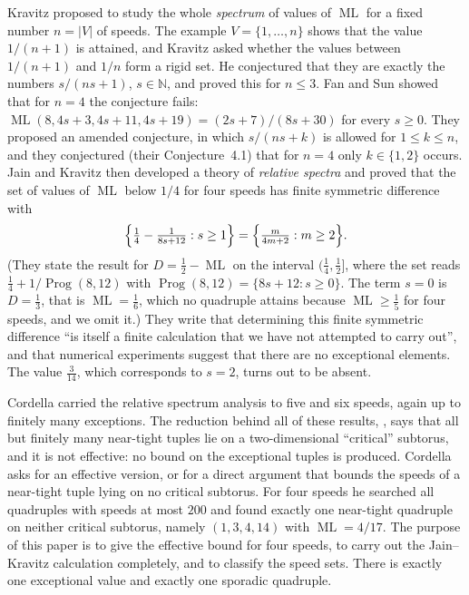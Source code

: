 \documentclass[12pt]{amsart}
\theoremstyle{definition}\newtheorem{definition}[theorem]{Definition}
\theoremstyle{remark}\newtheorem{remark}[theorem]{Remark}
\newcommand{\ML}{\operatorname{ML}}
\begin{document}
Kravitz \cite{Kravitz} proposed to study the whole \emph{spectrum} of values of $\ML$ for a fixed number $n=|V|$ of speeds. The example $V=\{1,\dots,n\}$ shows that the value $1/(n+1)$ is attained, and Kravitz asked whether the values between $1/(n+1)$ and $1/n$ form a rigid set. He conjectured that they are exactly the numbers $s/(ns+1)$, $s\in\mathbb N$, and proved this for $n\le 3$. Fan and Sun \cite{FanSun} showed that for $n=4$ the conjecture fails: $\ML(8,4s+3,4s+11,4s+19)=(2s+7)/(8s+30)$ for every $s\ge 0$. They proposed an amended conjecture, in which $s/(ns+k)$ is allowed for $1\le k\le n$, and they conjectured (their Conjecture~4.1) that for $n=4$ only $k\in\{1,2\}$ occurs. Jain and Kravitz \cite{JainKravitz} then developed a theory of \emph{relative spectra} and proved \cite[Theorem~1.3]{JainKravitz} that the set of values of $\ML$ below $1/4$ for four speeds has finite symmetric difference with
\begin{equation}\label{eq:JK}
 \Bigl\{\tfrac14-\tfrac{1}{8s+12}:s\ge 1\Bigr\}=\Bigl\{\tfrac{m}{4m+2}:m\ge 2\Bigr\}.
\end{equation}
(They state the result for $D=\frac12-\ML$ on the interval $(\frac14,\frac12]$, where the set reads $\frac14+1/\operatorname{Prog}(8,12)$ with $\operatorname{Prog}(8,12)=\{8s+12:s\ge0\}$. The term $s=0$ is $D=\frac13$, that is $\ML=\frac16$, which no quadruple attains because $\ML\ge\frac15$ for four speeds, and we omit it.) They write that determining this finite symmetric difference ``is itself a finite calculation that we have not attempted to carry out'', and that numerical experiments suggest that there are no exceptional elements. The value $\frac3{14}$, which corresponds to $s=2$, turns out to be absent.

Cordella \cite{Cordella} carried the relative spectrum analysis to five and six speeds, again up to finitely many exceptions. The reduction behind all of these results, \cite[Lemma~2.4]{Cordella}, says that all but finitely many near-tight tuples lie on a two-dimensional ``critical'' subtorus, and it is not effective: no bound on the exceptional tuples is produced. Cordella asks \cite[Question~6.7]{Cordella} for an effective version, or for a direct argument that bounds the speeds of a near-tight tuple lying on no critical subtorus. For four speeds he searched all quadruples with speeds at most $200$ \cite[Section~6.3]{Cordella} and found exactly one near-tight quadruple on neither critical subtorus, namely $(1,3,4,14)$ with $\ML=4/17$. The purpose of this paper is to give the effective bound for four speeds, to carry out the Jain--Kravitz calculation completely, and to classify the speed sets. There is exactly one exceptional value and exactly one sporadic quadruple.
\end{document}
